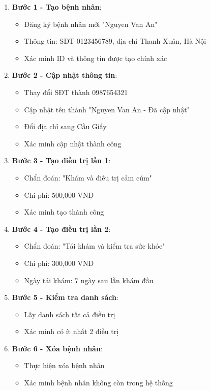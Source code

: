 \begin{enumerate}
    \item \textbf{Bước 1 - Tạo bệnh nhân}: 
    \begin{itemize}
        \item Đăng ký bệnh nhân mới "Nguyen Van An"
        \item Thông tin: SĐT 0123456789, địa chỉ Thanh Xuân, Hà Nội
        \item Xác minh ID và thông tin được tạo chính xác
    \end{itemize}
    
    \item \textbf{Bước 2 - Cập nhật thông tin}:
    \begin{itemize}
        \item Thay đổi SĐT thành 0987654321
        \item Cập nhật tên thành "Nguyen Van An - Đã cập nhật"
        \item Đổi địa chỉ sang Cầu Giấy
        \item Xác minh cập nhật thành công
    \end{itemize}
    
    \item \textbf{Bước 3 - Tạo điều trị lần 1}:
    \begin{itemize}
        \item Chẩn đoán: "Khám và điều trị cảm cúm"
        \item Chi phí: 500,000 VNĐ
        \item Xác minh tạo thành công
    \end{itemize}
    
    \item \textbf{Bước 4 - Tạo điều trị lần 2}:
    \begin{itemize}
        \item Chẩn đoán: "Tái khám và kiểm tra sức khỏe"
        \item Chi phí: 300,000 VNĐ
        \item Ngày tái khám: 7 ngày sau lần khám đầu
    \end{itemize}
    
    \item \textbf{Bước 5 - Kiểm tra danh sách}:
    \begin{itemize}
        \item Lấy danh sách tất cả điều trị
        \item Xác minh có ít nhất 2 điều trị
    \end{itemize}
    
    \item \textbf{Bước 6 - Xóa bệnh nhân}:
    \begin{itemize}
        \item Thực hiện xóa bệnh nhân
        \item Xác minh bệnh nhân không còn trong hệ thống
    \end{itemize}
\end{enumerate}

